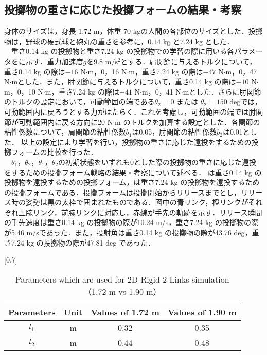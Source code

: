 \begin{small}
\subsection{投擲物の重さに応じた投擲フォームの結果・考察}
身体のサイズは，身長 1.72 m，体重 70 kgの人間の各部位のサイズとした．投擲物は，野球の硬式球と砲丸の重さを参考に，$0.14$ kg\cite{horiuchi} と$7.24$ kg\cite{haq} とした．\\
　重さ0.14 kg の投擲物と重さ7.24 kg の投擲物での学習の際に用いる各パラメータをに示す\cite{irving}．重力加速度$g$を9.8 $\mathrm{m/s^{2}}$とする．肩関節に与えるトルクについて，重さ0.14 kg の際は$-16$ N$\cdot$m，0，16 N$\cdot$m，重さ7.24 kg の際は$-47$ N$\cdot$m，0，47 N$\cdot$mとした．また，肘関節に与えるトルクについて，重さ0.14 kg の際は$-10$ N$\cdot$m，0，10 N$\cdot$m，重さ7.24 kg の際は$-41$ N$\cdot$m，0，41 N$\cdot$mとした．さらに肘関節のトルクの設定において，可動範囲の端である$\theta_{2} = 0$ または $\theta_{2} = 150$ degでは，可動範囲内に戻ろうとする力がはたらく．これを考慮し，可動範囲の端では肘関節が可動範囲内に戻る方向に20 N$\cdot$m のトルクを加算する設定とした．各関節の粘性係数について，肩関節の粘性係数$b_{1}$は0.05，肘関節の粘性係数$b_{2}$は0.01とした．
以上の設定により学習を行い，投擲物の重さに応じた遠投をするための投擲フォームの比較を行った．\\
　$\theta_{1}$，$\theta_{2}$，$\dot{\theta}_{1}$，$\dot{\theta}_{2}$の初期状態をいずれも0とした際の投擲物の重さに応じた遠投をするための投擲フォーム戦略の結果・考察について述べる．
は重さ0.14 kg の投擲物を遠投するための投擲フォーム，は重さ7.24 kg の投擲物を遠投するための投擲フォームである．投擲フォームは投擲開始からリリースまでとし，リリース時の姿勢は黒の太枠で囲まれたものである．図中の青リンク，橙リンクがそれぞれ上腕リンク，前腕リンクに対応し，赤線が手先の軌跡を示す．リリース瞬間の手先速度は重さ0.14 kg の投擲物の際が10.24 m/s，重さ7.24 kg の投擲物の際が5.46 m/sであった．また，投射角は重さ0.14 kg の投擲物の際が43.76 deg，重さ7.24 kg の投擲物の際が47.81 deg であった．
\begin{table}[tb]
  \begin{center}
    \caption{Parameters which are used for 2D Rigid 2 Links simulation（1.72 m vs 1.90 m）}
    \scalebox{0.7}[0.7]{
    \begin{tabular}{c|c|c|c}
      \hline
      Parameters & Unit & Values of 1.72 m & Values of 1.90 m \\
      \hline
      $l_{1}$ & m & 0.32 & 0.35 \\
      $l_{2}$ & m & 0.44 & 0.48 \\

\end{tabular}}
\end{center}
\end{table}
\end{small}
